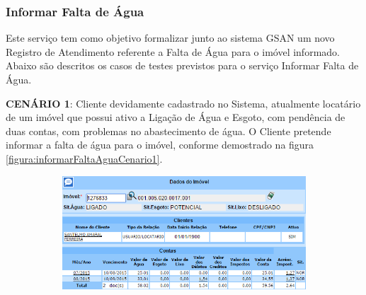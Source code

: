 \begin{flushleft}
\end{flushleft}


\subsubsection{Informar Falta de Água}
Este serviço tem como objetivo formalizar junto ao sistema GSAN um novo Registro de Atendimento referente a Falta de Água para o imóvel informado.
Abaixo são descritos os casos de testes previstos para o serviço Informar Falta de Água.
\begin{flushleft}
	\begin{description}
		\item \textbf{CENÁRIO 1}: Cliente devidamente cadastrado no Sistema, atualmente locatário de um imóvel que possui ativo a Ligação de Água e Esgoto, com pendência de duas contas, com problemas no abastecimento de água. O Cliente pretende informar a falta de água para o imóvel, conforme demostrado na figura \ref{figura:informarFaltaAguaCenario1}.
		\begin{figure}[H]
			\centering
			\caption{Informar Falta de Água - Cenário de Teste 1}
			\label{figura:informarFaltaAguaCenario1}
			\begin{subfigure}[H]{\textwidth}
				\centering
				\includegraphics{figuras/cenarios/informar_falta_agua/cenario_1.PNG}
			\end{subfigure}
		\end{figure}
	\end{description}
	

\end{flushleft}
